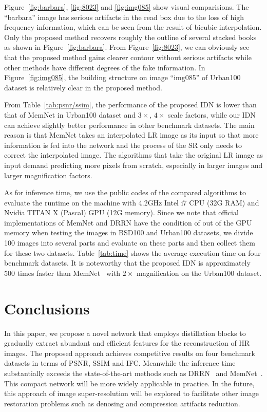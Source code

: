 \documentclass[10pt,twocolumn,letterpaper]{article}
\begin{document}
Figure~\ref{fig:barbara}, \ref{fig:8023} and \ref{fig:img085} show visual comparisions. The ``barbara'' image has serious artifacts in the read box due to the loss of high frequency information, which can be seen from the result of bicubic interpolation. Only the proposed method recovers roughly the outline of several stacked books as shown in Figure~\ref{fig:barbara}. From Figure~\ref{fig:8023}, we can obviously see that the proposed method gains clearer contour without serious artifacts while other methods have different degrees of the fake information. In Figure~\ref{fig:img085}, the building structure on image ``img085'' of Urban100 dataset is relatively clear in the proposed method.

From Table~\ref{tab:psnr/ssim}, the performance of the proposed IDN is lower than that of MemNet in Urban100 dataset and $3 \times$, $4 \times$ scale factors, while our IDN can achieve slightly better performance in other benchmark datasets. The main reason is that MemNet takes an interpolated LR image as its input so that more information is fed into the network and the process of the SR only needs to correct the interpolated image. The algorithms that take the original LR image as input demand predicting more pixels from scratch, especially in larger images and larger magnification factors.


As for inference time, we use the public codes of the compared algorithms to evaluate the runtime on the machine with 4.2GHz Intel i7 CPU (32G RAM) and Nvidia TITAN X (Pascal) GPU (12G memory). Since we note that official implementations of MemNet and DRRN have the condition of out of the GPU memory when testing the images in BSD100 and Urban100 datasets, we divide 100 images into several parts and evaluate on these parts and then collect them for these two datasets. Table~\ref{tab:time} shows the average execution time on four benchmark datasets. It is noteworthy that the proposed IDN is approximately 500 times faster than MemNet~\cite{MemNet} with $2 \times$ magnification on the Urban100 dataset.

\section{Conclusions}
In this paper, we propose a novel network that employs distillation blocks to gradually extract abundant and efficient features for the reconstruction of HR images. The proposed approach achieves competitive results on four benchmark datasets in terms of PSNR, SSIM and IFC. Meanwhile the inference time substantially exceeds the state-of-the-art methods such as DRRN~\cite{DRRN} and MemNet~\cite{MemNet}. This compact network will be more widely applicable in practice. In the future, this approach of image super-resolution will be explored to facilitate other image restoration problems such as denosing and compression artifacts reduction.

{\small


}
\end{document}
